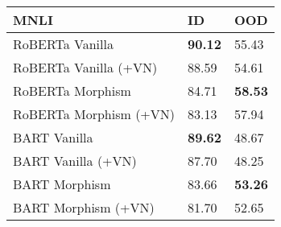 \begin{tabularx}{1.2\linewidth}{ l *{2}{Z} }
\hline
\textbf{MNLI} & \textbf{ID}& \textbf{OOD} \\
\hline
RoBERTa Vanilla  & \textbf{90.12} & 55.43 \\
RoBERTa Vanilla (+VN) & 88.59 & 54.61 \\
RoBERTa Morphism  & 84.71 & \textbf{58.53} \\
RoBERTa Morphism (+VN) & 83.13 & 57.94 \\
\hline
BART Vanilla  & \textbf{89.62} & 48.67   \\
BART Vanilla (+VN) & 87.70 & 48.25  \\
BART Morphism  &  83.66 & \textbf{53.26} \\
BART Morphism (+VN) &  81.70 & 52.65   \\
\hline
\end{tabularx}